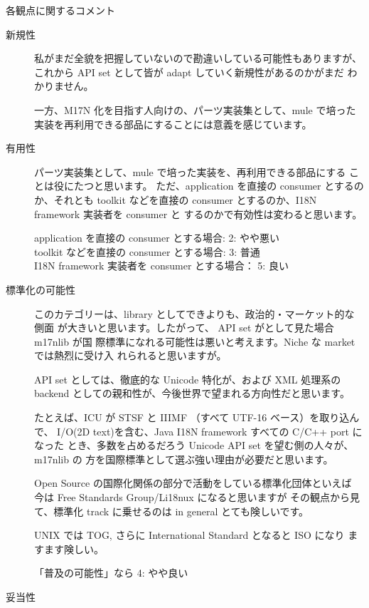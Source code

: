 各観点に関するコメント
\begin{description}
\item[新規性]

私がまだ全貌を把握していないので勘違いしている可能性もありますが、
これから API set として皆が adapt していく新規性があるのかがまだ
わかりません。

一方、M17N 化を目指す人向けの、パーツ実装集として、mule で培った
実装を再利用できる部品にすることには意義を感じています。

\item[有用性]

パーツ実装集として、mule で培った実装を、再利用できる部品にする
ことは役にたつと思います。
ただ、application を直接の consumer とするのか、それとも toolkit
などを直接の consumer とするのか、I18N framework 実装者を consumer と
するのかで有効性は変わると思います。

application を直接の consumer とする場合:     2: やや悪い\\
toolkit などを直接の consumer とする場合:     3: 普通\\
I18N framework 実装者を consumer とする場合： 5: 良い\\


\item[標準化の可能性]

このカテゴリーは、library としてできよりも、政治的・マーケット的な側面
が大きいと思います。したがって、 API set がとして見た場合m17nlib が国
際標準になれる可能性は悪いと考えます。Niche な market では熱烈に受け入
れられると思いますが。

API set としては、徹底的な Unicode 特化が、および XML 処理系の
backend としての親和性が、今後世界で望まれる方向性だと思います。

たとえば、ICU が STSF と IIIMF （すべて UTF-16 ベース）を取り込んで、
I/O(2D text)を含む、Java I18N framework すべての C/C++ port になった
とき、多数を占めるだろう Unicode API set を望む側の人々が、m17nlib の
方を国際標準として選ぶ強い理由が必要だと思います。 

Open Source の国際化関係の部分で活動をしている標準化団体といえば
今は Free Standards Group/Li18nux になると思いますが
その観点から見て、標準化 track に乗せるのは in general とても険しいです。

UNIX では TOG, さらに International Standard となると ISO になり
ますます険しい。

「普及の可能性」なら	4: やや良い


\item[妥当性]


\end{description}
